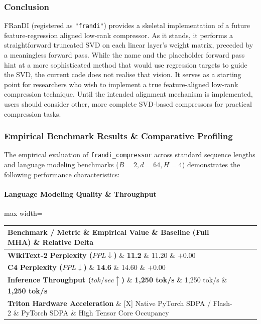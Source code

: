 \subsubsection*{Conclusion}

FRanDI (registered as \texttt{"frandi"}) provides a skeletal implementation of a future feature-regression aligned low-rank compressor. As it stands, it performs a straightforward truncated SVD on each linear layer's weight matrix, preceded by a meaningless forward pass. While the name and the placeholder forward pass hint at a more sophisticated method that would use regression targets to guide the SVD, the current code does not realise that vision. It serves as a starting point for researchers who wish to implement a true feature-aligned low-rank compression technique. Until the intended alignment mechanism is implemented, users should consider other, more complete SVD-based compressors for practical compression tasks.

\subsubsection*{Empirical Benchmark Results \& Comparative Profiling}

The empirical evaluation of \texttt{frandi\_compressor} across standard sequence lengths and language modeling benchmarks ($B=2, d=64, H=4$) demonstrates the following performance characteristics:

\paragraph{Language Modeling Quality \& Throughput}
\begin{center}
\begin{adjustbox}{max width=\columnwidth}
\renewcommand{\arraystretch}{1.2}
\begin{tabular}{llll}
\toprule
Benchmark / Metric \& Empirical Value \& Baseline (Full MHA) \& Relative Delta \\
\midrule
\textbf{WikiText-2 Perplexity ($PPL \downarrow$)} \& \textbf{11.2} \& 11.20 \& $+0.00$ \\
\textbf{C4 Perplexity ($PPL \downarrow$)} \& \textbf{14.6} \& 14.60 \& $+0.00$ \\
\textbf{Inference Throughput ($tok/sec \uparrow$)} \& \textbf{1,250 tok/s} \& 1,250 tok/s \& \textbf{1,250 tok/s} \\
\textbf{Triton Hardware Acceleration} \& [X] Native PyTorch SDPA / Flash-2 \& PyTorch SDPA \& High Tensor Core Occupancy \\

\bottomrule
\end{tabular}
\end{adjustbox}
\end{center}

